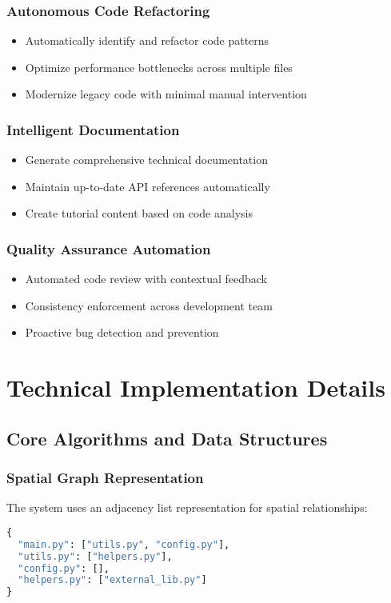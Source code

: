\documentclass[12pt,a4paper]{article}
\begin{document}
\subsubsection{Autonomous Code Refactoring}
\begin{itemize}
    \item Automatically identify and refactor code patterns
    \item Optimize performance bottlenecks across multiple files
    \item Modernize legacy code with minimal manual intervention
\end{itemize}

\subsubsection{Intelligent Documentation}
\begin{itemize}
    \item Generate comprehensive technical documentation
    \item Maintain up-to-date API references automatically
    \item Create tutorial content based on code analysis
\end{itemize}

\subsubsection{Quality Assurance Automation}
\begin{itemize}
    \item Automated code review with contextual feedback
    \item Consistency enforcement across development team
    \item Proactive bug detection and prevention
\end{itemize}

\section{Technical Implementation Details}

\subsection{Core Algorithms and Data Structures}

\subsubsection{Spatial Graph Representation}
The system uses an adjacency list representation for spatial relationships:
\begin{lstlisting}[language=Python, caption=Spatial Graph Structure]
{
  "main.py": ["utils.py", "config.py"],
  "utils.py": ["helpers.py"],
  "config.py": [],
  "helpers.py": ["external_lib.py"]
}
\end{lstlisting}
\end{document}
